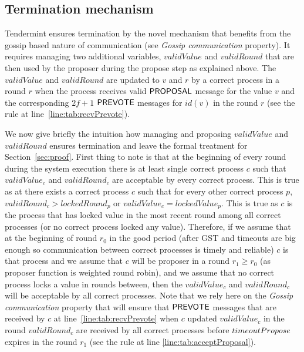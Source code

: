 \subsection{Termination mechanism}

Tendermint ensures termination by the novel mechanism that benefits from the gossip based nature of communication (see \emph{Gossip communication} property).  
 It requires managing two additional variables, $validValue$ and $validRound$ that are then used by the proposer during the propose step as explained above.   
The $validValue$ and $validRound$ are updated to $v$ and $r$ by a correct process in a round $r$ when the process receives valid $\mathsf{PROPOSAL}$ message for the value $v$ and the corresponding $2f+1$ $\mathsf{PREVOTE}$ messages for $id(v)$ in the round $r$ (see the rule at line~\ref{line:tab:recvPrevote}).

We now give briefly the intuition how managing and proposing $validValue$ and $validRound$ ensures termination and leave the formal treatment for Section~\ref{sec:proof}.  First thing to note is that at the beginning of every round during the system execution there is at least single correct process $c$ such that $validValue_c$ and $validRound_c$ are acceptable by every correct process. This is true as at there exists a correct process $c$ such that for every other correct process $p$, $validRound_c > lockedRound_p$ or $validValue_c = lockedValue_p$. This is true as $c$ is the process that has locked value in the most recent round among all correct processes (or no correct process locked any value). Therefore, if we assume that at the beginning of round $r_0$ in the good period (after GST and timeouts are big enough so communication between correct processes is timely and reliable) $c$ is that process and we assume that $c$ will be proposer in a round $r_1 \ge r_0$ (as proposer function is weighted round robin), and we assume that no correct process locks a value in rounds between, then the $validValue_c$ and $validRound_c$ will be acceptable by all correct processes. Note that we rely here on the \emph{Gossip communication} property that will ensure that $\mathsf{PREVOTE}$ messages that are received by $c$ at line~\ref{line:tab:recvPrevote} when $c$ updated $validValue_c$ in the round $validRound_c$ are received by all correct processes before $timeoutPropose$ expires in the round $r_1$ (see the rule at line \ref{line:tab:acceptProposal}).   

